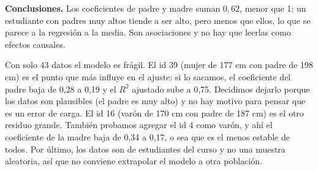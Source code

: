 \documentclass[10pt,a4paper]{article}
\begin{document}
\textbf{Conclusiones.} Los coeficientes de padre y madre suman $0{,}62$, menor que 1: un estudiante con padres muy altos tiende a ser alto, pero menos que ellos, lo que se parece a la regresión a la media. Son asociaciones y no hay que leerlas como efectos causales.

Con solo 43 datos el modelo es frágil. El id 39 (mujer de 177 cm con padre de 198 cm) es el punto que más influye en el ajuste: si lo sacamos, el coeficiente del padre baja de 0,28 a 0,19 y el $R^2$ ajustado sube a 0,75. Decidimos dejarlo porque los datos son plausibles (el padre es muy alto) y no hay motivo para pensar que es un error de carga. El id 16 (varón de 170 cm con padre de 187 cm) es el otro residuo grande. También probamos agregar el id 4 como varón, y ahí el coeficiente de la madre baja de 0,34 a 0,17, o sea que es el menos estable de todos. Por último, los datos son de estudiantes del curso y no una muestra aleatoria, así que no conviene extrapolar el modelo a otra población.
\end{document}
